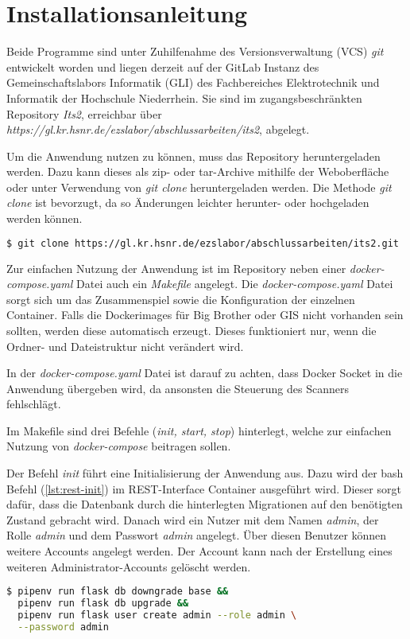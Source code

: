 \section{Installationsanleitung}
Beide Programme sind unter Zuhilfenahme des Versionsverwaltung (VCS) \textit{git} entwickelt worden und liegen derzeit auf der GitLab Instanz des Gemeinschaftslabors Informatik (GLI) des Fachbereiches Elektrotechnik und Informatik der Hochschule Niederrhein. Sie sind im zugangsbeschränkten Repository \textit{Its2}, erreichbar über\\ \textit{https://gl.kr.hsnr.de/ezslabor/abschlussarbeiten/its2}, abgelegt.

Um die Anwendung nutzen zu können, muss das Repository heruntergeladen werden.
Dazu kann dieses als zip- oder tar-Archive mithilfe der Weboberfläche oder unter Verwendung von \textit{git clone} heruntergeladen werden. Die Methode \textit{git clone} ist bevorzugt, da so Änderungen leichter herunter- oder hochgeladen werden können.

\begin{lstlisting}[language=bash, caption={git clone (bash)}, captionpos=b, label={lst:git-clone}]
$ git clone https://gl.kr.hsnr.de/ezslabor/abschlussarbeiten/its2.git
\end{lstlisting}

Zur einfachen Nutzung der Anwendung ist im Repository neben einer \textit{docker-compose.yaml} Datei auch ein \textit{Makefile} angelegt. Die \textit{docker-compose.yaml} Datei sorgt sich um das Zusammenspiel sowie die Konfiguration der einzelnen Container. Falls die Dockerimages für Big Brother oder GIS nicht vorhanden sein sollten, werden diese automatisch erzeugt. Dieses funktioniert nur, wenn die Ordner- und Dateistruktur nicht verändert wird.

In der \textit{docker-compose.yaml} Datei ist darauf zu achten, dass Docker Socket in die Anwendung übergeben wird, da ansonsten die Steuerung des Scanners fehlschlägt.

Im Makefile sind drei Befehle (\textit{init, start, stop}) hinterlegt, welche zur einfachen Nutzung von \textit{docker-compose} beitragen sollen.

Der Befehl \textit{init} führt eine Initialisierung der Anwendung aus. Dazu wird der bash Befehl (\ref{lst:rest-init}) im REST-Interface Container ausgeführt wird.
Dieser sorgt dafür, dass die Datenbank durch die hinterlegten Migrationen auf den benötigten Zustand gebracht wird. Danach wird ein Nutzer mit dem Namen \textit{admin}, der Rolle \textit{admin} und dem Passwort \textit{admin} angelegt. Über diesen Benutzer können weitere Accounts angelegt werden. Der Account kann nach der Erstellung eines weiteren Administrator-Accounts gelöscht werden.
\begin{lstlisting}[language=bash, caption={Initalisierung REST-Interface (bash)}, captionpos=b, label={lst:rest-init}]
$ pipenv run flask db downgrade base && 
  pipenv run flask db upgrade && 
  pipenv run flask user create admin --role admin \
  --password admin
\end{lstlisting}

